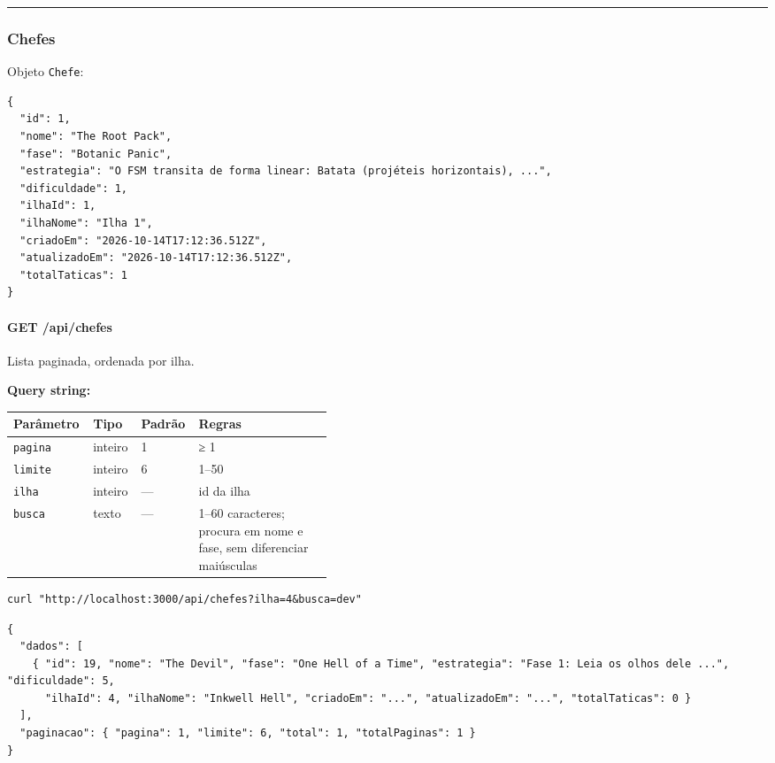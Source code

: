 \begin{center}\rule{0.5\linewidth}{0.5pt}\end{center}

\hypertarget{chefes}{%
\subsubsection{Chefes}\label{chefes}}

Objeto \texttt{Chefe}:

\begin{Verbatim}[breaklines,breakanywhere,fontsize=\scriptsize]
{
  "id": 1,
  "nome": "The Root Pack",
  "fase": "Botanic Panic",
  "estrategia": "O FSM transita de forma linear: Batata (projéteis horizontais), ...",
  "dificuldade": 1,
  "ilhaId": 1,
  "ilhaNome": "Ilha 1",
  "criadoEm": "2026-10-14T17:12:36.512Z",
  "atualizadoEm": "2026-10-14T17:12:36.512Z",
  "totalTaticas": 1
}
\end{Verbatim}

\hypertarget{get-apichefes}{%
\paragraph{GET /api/chefes}\label{get-apichefes}}

Lista paginada, ordenada por ilha.

\textbf{Query string:}

\begin{longtable}[]{@{}lllp{0.42\linewidth}@{}}
\toprule\noalign{}
Parâmetro & Tipo & Padrão & Regras \\
\midrule\noalign{}
\endhead
\bottomrule\noalign{}
\endlastfoot
\texttt{pagina} & inteiro & 1 & ≥ 1 \\
\texttt{limite} & inteiro & 6 & 1--50 \\
\texttt{ilha} & inteiro & --- & id da ilha \\
\texttt{busca} & texto & --- & 1--60 caracteres; procura em nome e fase,
sem diferenciar maiúsculas \\
\end{longtable}

\begin{Verbatim}[breaklines,breakanywhere,fontsize=\scriptsize]
curl "http://localhost:3000/api/chefes?ilha=4&busca=dev"
\end{Verbatim}

\begin{Verbatim}[breaklines,breakanywhere,fontsize=\scriptsize]
{
  "dados": [
    { "id": 19, "nome": "The Devil", "fase": "One Hell of a Time", "estrategia": "Fase 1: Leia os olhos dele ...", "dificuldade": 5,
      "ilhaId": 4, "ilhaNome": "Inkwell Hell", "criadoEm": "...", "atualizadoEm": "...", "totalTaticas": 0 }
  ],
  "paginacao": { "pagina": 1, "limite": 6, "total": 1, "totalPaginas": 1 }
}
\end{Verbatim}

